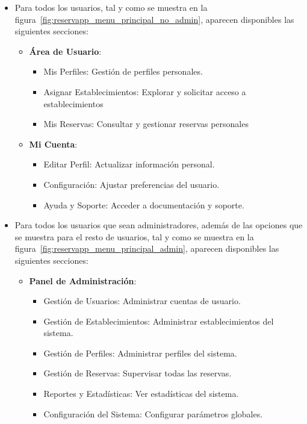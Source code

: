 \begin{itemize}
   \item Para todos los usuarios, tal y como se muestra en la figura~\ref{fig:reservapp_menu_principal_no_admin}, aparecen disponibles las siguientes secciones:
   \begin{itemize}
      \item \textbf{Área de Usuario}:
      \begin{itemize}
         \item Mis Perfiles: Gestión de perfiles personales.
         \item Asignar Establecimientos: Explorar y solicitar acceso a establecimientos
         \item Mis Reservas: Consultar y gestionar reservas personales
      \end{itemize}
      \item \textbf{Mi Cuenta}:
      \begin{itemize}
         \item Editar Perfil: Actualizar información personal.
         \item Configuración: Ajustar preferencias del usuario.
         \item Ayuda y Soporte: Acceder a documentación y soporte.
      \end{itemize}
   \end{itemize}
   \item Para todos los usuarios que sean administradores, además de las opciones que se muestra para el resto de usuarios,  tal y como se muestra en la figura~\ref{fig:reservapp_menu_principal_admin}, aparecen disponibles las siguientes secciones:
   \begin{itemize}
      \item \textbf{Panel de Administración}:
      \begin{itemize}
         \item Gestión de Usuarios: Administrar cuentas de usuario.
         \item Gestión de Establecimientos: Administrar establecimientos del sistema.
         \item Gestión de Perfiles: Administrar perfiles del sistema.
         \item Gestión de Reservas: Supervisar todas las reservas.
         \item Reportes y Estadísticas: Ver estadísticas del sistema.
         \item Configuración del Sistema: Configurar parámetros globales.
      \end{itemize}
   \end{itemize}
\end{itemize}

